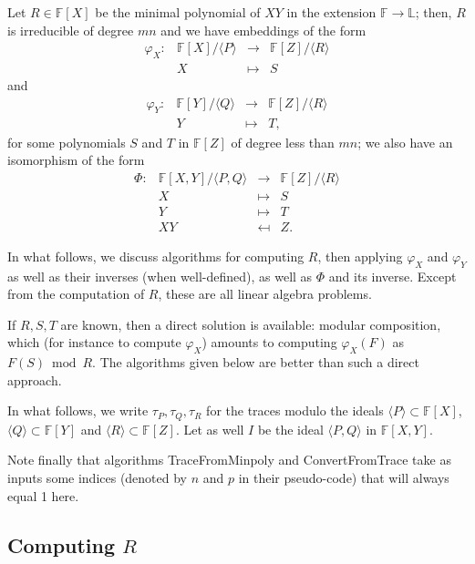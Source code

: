 \documentclass[12pt]{article}
\def\M {\ensuremath{\mathsf{M}}}
\def\F {\ensuremath{\mathbb{F}}}
\def\L {\ensuremath{\mathbb{L}}}
\begin{document}
Let $R \in \F[X]$ be the minimal polynomial of $XY$ in the extension
$\F\to \L$; then, $R$ is irreducible of degree $m n$ and we have embeddings
of the form
$$\begin{array}{cccc}
\varphi_X: & \F[X]/\langle P \rangle & \to & \F[Z]/\langle R \rangle\\
& X & \mapsto & S
\end{array}$$
and
$$\begin{array}{cccc}
\varphi_Y: & \F[Y]/\langle Q \rangle & \to & \F[Z]/\langle R \rangle\\
& Y & \mapsto & T,
\end{array}$$
for some polynomials $S$ and $T$ in $\F[Z]$ of degree less than $mn$; 
we also have an isomorphism of the form
$$\begin{array}{cccc} 
\Phi:&  \F[X,Y]/\langle P,Q\rangle & \to & \F[Z]/\langle R \rangle \\
&  X & \mapsto & S \\
&  Y & \mapsto & T \\
&  XY & \mapsfrom & Z.
\end{array}$$

In what follows, we discuss algorithms for computing $R$, then
applying $\varphi_X$ and $\varphi_Y$ as well as their inverses (when
well-defined), as well as $\Phi$ and its inverse. Except from the
computation of $R$, these are all linear algebra problems. 

If $R,S,T$ are known, then a direct solution is available: modular
composition, which (for instance to compute $\varphi_X$) amounts to
computing $\varphi_X(F)$ as $F(S) \bmod R$. The algorithms given below
are better than such a direct approach.

In what follows, we write $\tau_P,\tau_Q,\tau_R$ for the traces modulo
the ideals $\langle P\rangle\subset \F[X]$, $\langle Q \rangle \subset
\F[Y]$ and $\langle R \rangle \subset \F[Z]$. Let as well $I$ be the ideal
$\langle P, Q\rangle$ in $\F[X,Y]$.

Note finally that algorithms TraceFromMinpoly and ConvertFromTrace
take as inputs some indices (denoted by $n$ and $p$ in their
pseudo-code) that will always equal 1 here.



\subsection{Computing $R$} 
\end{document}

